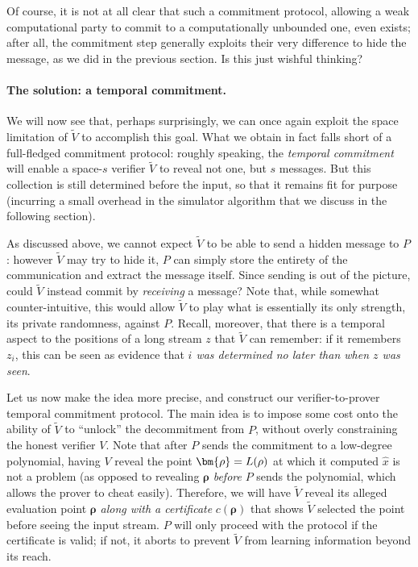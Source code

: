 \documentclass[a4paper,UKenglish,cleveref, autoref, thm-restate]{lipics-v2021}
\theoremstyle{definition}
\newcommand{\vcommitstring}{z}
\newcommand{\fingerprinttuple}{\bm{\rho}}
\renewcommand{\line}{L}
\def\rfe#1{
    \ifnum#1=1
        \rho
    \else
    \ifnum#1=2
        \sigma
    \else
    \fi\fi
}
\begin{document}
    Of course, it is not at all clear that such a commitment protocol, allowing a weak computational party to commit to a computationally unbounded one, even exists; after all, the commitment step generally exploits their very difference to hide the message, as we did in the previous section. Is this just wishful thinking?
    
    \paragraph*{The solution: a temporal commitment\iflipics\else.\fi} We will now see that, perhaps surprisingly, we can once again exploit the space limitation of $\widetilde V$ to accomplish this goal. What we obtain in fact falls short of a full-fledged commitment protocol: roughly speaking, the \emph{temporal  commitment} will enable a space-$s$ verifier $\widetilde V$ to reveal not one, but $s$ messages. But this collection is still determined before the input, so that it remains fit for purpose (incurring a small overhead in the simulator algorithm that we discuss in the following section).
    
    As discussed above, we cannot expect $\widetilde V$ to be able to send a hidden message to $P$: however $\widetilde V$ may try to hide it, $P$ can simply store the entirety of the communication and extract the message itself. Since sending is out of the picture, could $\widetilde V$ instead commit by \emph{receiving} a message? Note that, while somewhat counter-intuitive, this would allow $\widetilde V$ to play what is essentially its only strength, its private randomness, against $P$. Recall, moreover, that there is a temporal aspect to the positions of a long stream $\vcommitstring$ that $\widetilde V$ can remember: if it remembers $\vcommitstring_i$, this can be seen as evidence that \emph{$i$ was determined no later than when $\vcommitstring$ was seen}.
    
    Let us now make the idea more precise, and construct our verifier-to-prover temporal commitment protocol. The main idea is to impose some cost onto the ability of $\widetilde V$ to ``unlock'' the decommitment from $P$, without overly constraining the honest verifier $V$. Note that after $P$ sends the commitment to a low-degree polynomial, having $V$ reveal the point $\fingerprinttuple = \line(\rfe1)$ at which it computed $\hat x$ is not a problem (as opposed to revealing $\fingerprinttuple$ \emph{before} $P$ sends the polynomial, which allows the prover to cheat easily). Therefore, we will have $\widetilde V$ reveal its alleged evaluation point $\fingerprinttuple$ \emph{along with a certificate} $c(\fingerprinttuple)$ that shows $\widetilde V$ selected the point before seeing the input stream. $P$ will only proceed with the protocol if the certificate is valid; if not, it aborts to prevent $\widetilde V$ from learning information beyond its reach.
    
\end{document}
